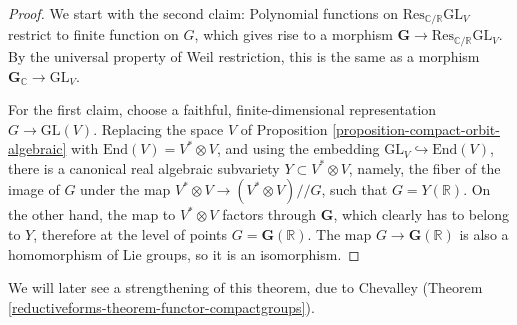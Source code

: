 \begin{proof}
We start with the second claim: Polynomial functions on $\text{Res}_{\mathbb C/\mathbb R} \text{GL}_V$ restrict to finite function on $G$, which gives rise to a morphism $\mathbf G \to \text{Res}_{\mathbb C/\mathbb R} \text{GL}_V$. By the universal property of Weil restriction, this is the same as a morphism $\mathbf G_{\mathbb C}\to \text{GL}_V$.

For the first claim, choose a faithful, finite-dimensional representation $G\to \text{GL}(V)$. Replacing the space $V$ of Proposition \ref{proposition-compact-orbit-algebraic} with $\text{End}(V)=V^*\otimes V$, and using the embedding $\text{GL}_V\hookrightarrow \text{End}(V)$, there is a canonical real algebraic subvariety $Y\subset V^*\otimes V$, namely, the fiber of the image of $G$ under the map $V^*\otimes V\to (V^*\otimes V)//G$, such that $G = Y(\mathbb R)$. On the other hand, the map to $V^*\otimes V$ factors through $\mathbf G$, which clearly has to belong to $Y$, therefore at the level of points $G=\mathbf G(\mathbb R)$. The map $G\to \mathbf G(\mathbb R)$ is also a homomorphism of Lie groups, so it is an isomorphism. 
\end{proof}

We will later see a strengthening of this theorem, due to Chevalley (Theorem \ref{reductiveforms-theorem-functor-compactgroups}). 

















